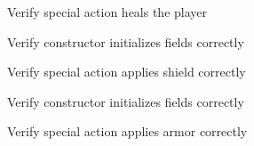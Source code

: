 \begin{DoxyRefList}
\label{test__test000063}%
%
Verify  special action heals the player  



\label{test__test000064}%
%
Verify  constructor initializes fields correctly  



\label{test__test000065}%
%
Verify  special action applies shield correctly  



\label{test__test000066}%
%
Verify  constructor initializes fields correctly  



\label{test__test000067}%
%
Verify  special action applies armor correctly  


\end{DoxyRefList}